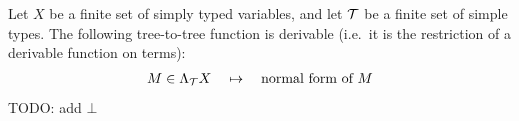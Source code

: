 \begin{theorem}\label{thm:normalise} Let $X$ be a finite set of simply typed variables, and let $\mathcal T$ be a finite set of simple types.
    The following tree-to-tree function is derivable (i.e.~it is the restriction of a derivable function on terms):
    \begin{align*}
        M \in \Lambda_{\mathcal T} X  \quad \mapsto \quad  \text{normal form of $M$}        
    \end{align*}
    TODO: add $\bot$
\end{theorem}






